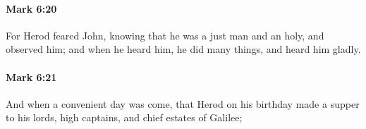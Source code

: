 		\paragraph{Mark 6:20} %
			\label{MARK-6-20}

			For Herod feared John, knowing that he was a just man and an holy, and observed him; and when he heard him, he did many things, and heard him gladly.

			\begin{framed}
			\scriptsize
				\begin{compactdesc}
					\item[SBLG] 
				\end{compactdesc}
			\end{framed}

		\paragraph{Mark 6:21} %
			\label{MARK-6-21}

			And when a convenient day was come, that Herod on his birthday made a supper to his lords, high captains, and chief estates of Galilee;

